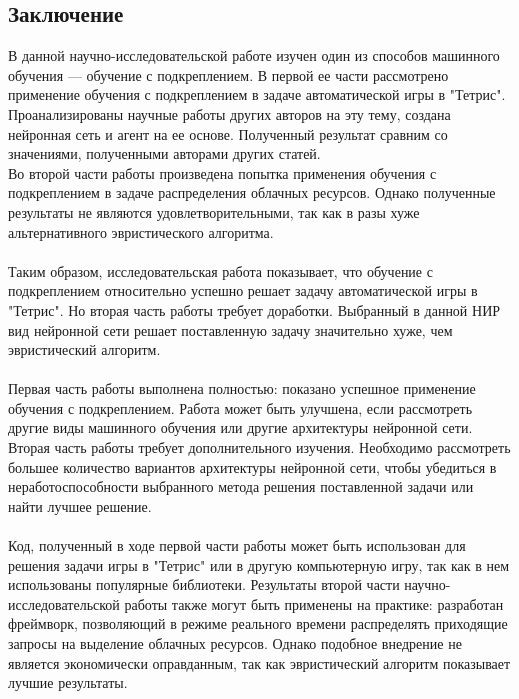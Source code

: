 \documentclass[draft]{article}
\begin{document}
\begin{center}
\section {Заключение}
\end{center}
В данной научно-исследовательской работе изучен один из способов машинного обучения — обучение с подкреплением. В первой ее части рассмотрено применение обучения с подкреплением в задаче автоматической игры в "Тетрис". Проанализированы научные работы других авторов на эту тему, создана нейронная сеть и агент на ее основе. Полученный результат сравним со значениями, полученными авторами других статей.\\
Во второй части работы произведена попытка применения обучения с подкреплением в задаче распределения облачных ресурсов. Однако полученные результаты не являются удовлетворительными, так как в разы хуже альтернативного эвристического алгоритма.\\
~\\
Таким образом, исследовательская работа показывает, что обучение с подкреплением относительно успешно решает задачу автоматической игры в "Тетрис". Но вторая часть работы требует доработки. Выбранный в данной НИР вид нейронной сети решает поставленную задачу значительно хуже, чем эвристический алгоритм.\\
~\\
Первая часть работы выполнена полностью: показано успешное применение обучения с подкреплением. Работа может быть улучшена, если рассмотреть другие виды машинного обучения или другие архитектуры нейронной сети. Вторая часть работы требует дополнительного изучения. Необходимо рассмотреть большее количество вариантов архитектуры нейронной сети, чтобы убедиться в неработоспособности выбранного метода решения поставленной задачи или найти лучшее решение.\\
~\\
Код, полученный в ходе первой части работы может быть использован для решения задачи игры в "Тетрис" или в другую компьютерную игру, так как в нем использованы популярные библиотеки. Результаты второй части научно-исследовательской работы также могут быть применены на практике: разработан фреймворк, позволяющий в режиме реального времени распределять приходящие запросы на выделение облачных ресурсов. Однако подобное внедрение не является экономически оправданным, так как эвристический алгоритм показывает лучшие результаты.\\
~\\
\end{document}
